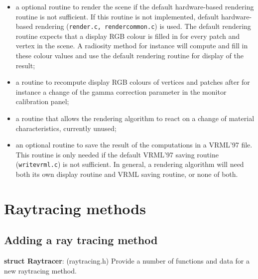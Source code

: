 \documentclass[11pt]{report}
\begin{document}
\begin{itemize}
\item	a optional routine to render the scene if the default hardware-based rendering
	routine is not sufficient. If this routine is not implemented, default
	hardware-based rendering ({\tt render.c, rendercommon.c}) is used. The
	default rendering routine expects that a display RGB colour is filled in
	for every patch and vertex in the scene. A radiosity method for instance
	will compute and fill in these colour values and use the default rendering
	routine for display of the result;
\item	a routine to recompute display RGB colours of vertices and patches after 
	for instance a change of the gamma correction parameter in the monitor
	calibration panel;
\item	a routine that allows the rendering algorithm to react on a change of
	material characteristics, currently unused;
\item	an optional routine to save the result of the computations in a VRML'97
	file. This routine is only needed if the default VRML'97 saving 
	routine ({\tt writevrml.c}) is not sufficient. In general, a rendering
	algorithm will need both its own display routine and VRML saving routine,
	or none of both.
\end{itemize}


\chapter{Raytracing methods}
\label{raytracing-methods}


\section{Adding a ray tracing method}

{\bf struct Raytracer}: (raytracing.h) Provide a number
of functions and data for a new raytracing method.
\end{document}
